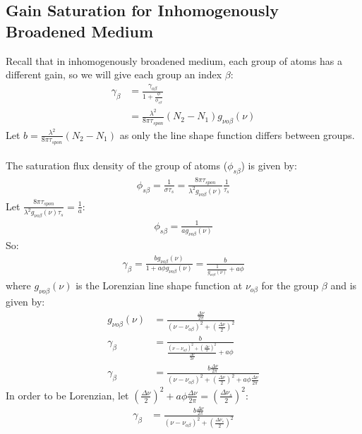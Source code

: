 \documentclass[11pt]{article}
\begin{document}
\subsection{Gain Saturation for Inhomogenously Broadened Medium}
Recall that in inhomogenously broadened medium, each group of atoms has a different gain, so we will give each group an index $\beta$:
\begin{align*}
    \gamma_{\beta} &= \frac{\gamma_{o\beta}}{1 + \frac{\phi}{\phi_{s \beta}}} \\
    &= \frac{\lambda^2}{8 \pi \tau_{spon}} (N_2 - N_1) g_{\nu o \beta}(\nu)
\end{align*}
Let $b = \frac{\lambda^2}{8 \pi \tau_{spon}} (N_2 - N_1)$ as only the line shape function differs between groups. \\ \\
The saturation flux density of the group of atoms ($\phi_{s \beta}$) is given by:
\begin{align*}
    \phi_{s \beta} = \frac{1}{\sigma \tau_s} = \frac{8 \pi \tau_{spon}}{\lambda^2 g_{\nu o \beta}(\nu)} \frac{1}{\tau_s}
\end{align*}
Let $ \frac{8 \pi \tau_{spon}}{\lambda^2 g_{\nu o \beta}(\nu) \tau_s} = \frac{1}{a}$:
\begin{align*}
    \phi_{s \beta} = \frac{1}{a g_{\nu o \beta}(\nu)}
\end{align*}
So:
\begin{align*}
    \gamma_{\beta} = \frac{b g_{\nu o \beta}(\nu)}{1 + a \phi g_{\nu o \beta}(\nu)} = \frac{b}{\frac{1}{g_{\nu o \beta}(\nu)} + a \phi} 
\end{align*}
where $g_{\nu o \beta}(\nu)$ is the Lorenzian line shape function at $\nu_{o \beta}$ for the group $\beta$ and is given by:
\begin{align*}
    g_{\nu o \beta}(\nu) &= \frac{\frac{\Delta \nu}{2 \pi}}{(\nu - \nu_{o \beta})^2 + \left(\frac{\Delta \nu}{2}\right)^2} \\
    \gamma_{\beta} &= \frac{b}{\frac{(\nu - \nu_{o \beta})^2 + \left(\frac{\Delta \nu}{2}\right)^2}{\frac{\Delta \nu}{2 \pi}} + a \phi} \\
    \gamma_{\beta} &= \frac{b \frac{\Delta \nu}{2 \pi}}{(\nu - \nu_{o \beta})^2 + \left(\frac{\Delta \nu}{2}\right)^2 + a \phi \frac{\Delta \nu}{2 \pi}}
\end{align*}
In order to be Lorenzian, let $\left(\frac{\Delta \nu}{2}\right)^2 + a \phi \frac{\Delta \nu}{2 \pi} = \left(\frac{\Delta \nu_s}{2}\right)^2$:
\begin{align*}
    \gamma_{\beta} &= \frac{b \frac{\Delta \nu}{2 \pi}}{(\nu - \nu_{o \beta})^2 + \left(\frac{\Delta \nu_s}{2}\right)^2}
\end{align*}
\end{document}
